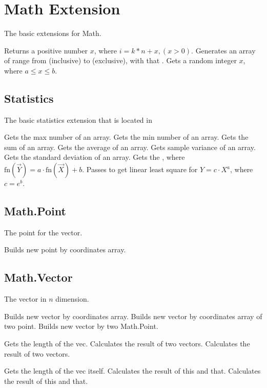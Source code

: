 \section{Math Extension}
The basic extensions for Math.

Returns a positive number $x$, where $i = k * n + x, (x > 0)$.
Generates an array of range from  (inclusive) to  (exclusive), with that .
Gets a random integer $x$, where $ a \leq x \leq b $.
 
\subsection{Statistics}
The basic statistics extension that is located in 

Gets the max number of an array.
Gets the min number of an array.
Gets the sum of an array.
Gets the average of an array.
Gets sample variance of an array.
Gets the standard deviation of an array.
Gets the \cd{[a, b]}, where $\mathrm{fn}(\vec{Y}) = a \cdot \mathrm{fn}(\vec{X}) + b$. Passes  to get linear least square for $Y = c \cdot X^a$, where $c = e^b$.


\subsection{Math.Point}
The point for the vector.

Builds new point by coordinates array.

\subsection{Math.Vector}
The vector in $n$ dimension.

Builds new vector by coordinates array.
Builds new vector by coordinates array of two point.
Builds new vector by two Math.Point.

Gets the length of the vec.
Calculates the  result of two vectors.
Calculates the  result of two vectors.

Gets the length of the vec itself.
Calculates the  result of this and that.
Calculates the  result of this and that.